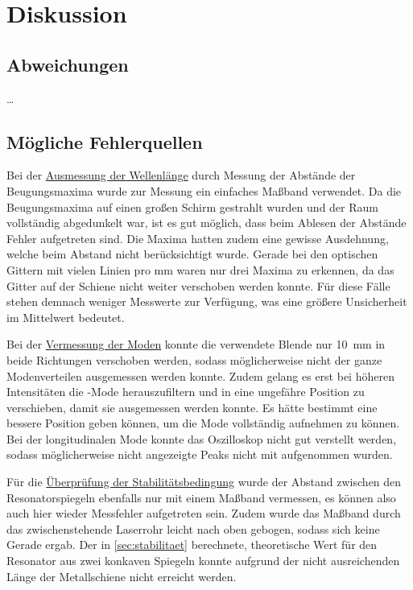 \section{Diskussion}
\label{sec:diskussion}

\subsection{Abweichungen}

…


\subsection{Mögliche Fehlerquellen}
    Bei der \hyperref[sec:auswertung:wellenlaenge]{Ausmessung der Wellenlänge} durch Messung der Abstände der Beugungsmaxima wurde zur Messung ein einfaches Maßband verwendet.
    Da die Beugungsmaxima auf einen großen Schirm gestrahlt wurden und der Raum vollständig abgedunkelt war,
    ist es gut möglich,
    dass beim Ablesen der Abstände Fehler aufgetreten sind.
    Die Maxima hatten zudem eine gewisse Ausdehnung,
    welche beim Abstand nicht berücksichtigt wurde.
    Gerade bei den optischen Gittern mit vielen Linien pro \si{\milli\meter} waren nur drei Maxima zu erkennen,
    da das Gitter auf der Schiene nicht weiter verschoben werden konnte.
    Für diese Fälle stehen demnach weniger Messwerte zur Verfügung,
    was eine größere Unsicherheit im Mittelwert bedeutet.


    Bei der \hyperref[sec:auswertung:tem_moden]{Vermessung der Moden} konnte die verwendete Blende nur \SI{10}{\milli\meter} in beide Richtungen verschoben werden,
    sodass möglicherweise nicht der ganze Modenverteilen ausgemessen werden konnte.
    Zudem gelang es erst bei höheren Intensitäten
    die -Mode herauszufiltern und in eine ungefähre Position zu verschieben,
    damit sie ausgemessen werden konnte.
    Es hätte bestimmt eine bessere Position geben können,
    um die Mode vollständig aufnehmen zu können.
    Bei der longitudinalen Mode konnte das Oszilloskop nicht gut verstellt werden,
    sodass möglicherweise nicht angezeigte Peaks nicht mit aufgenommen wurden.


    Für die \hyperref[sec:auswertung:stabilitaetsbedingung]{Überprüfung der Stabilitätsbedingung} wurde der Abstand zwischen den Resonatorspiegeln ebenfalls nur mit einem Maßband vermessen,
    es können also auch hier wieder Messfehler aufgetreten sein.
    Zudem wurde das Maßband durch das zwischenstehende Laserrohr leicht nach oben gebogen,
    sodass sich keine Gerade ergab.
    Der in \autoref{sec:stabilitaet} berechnete,
    theoretische Wert für den Resonator aus zwei konkaven Spiegeln
    konnte aufgrund der nicht ausreichenden Länge der Metallschiene nicht erreicht werden.


